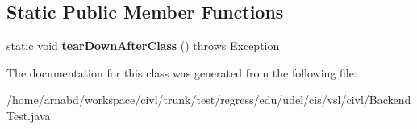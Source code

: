 \subsection*{Static Public Member Functions}
\begin{DoxyCompactItemize}
\item 
\hypertarget{classedu_1_1udel_1_1cis_1_1vsl_1_1civl_1_1BackendTest_af29d69efd634d50d443df2d17bf09dce}{}static void {\bfseries tear\+Down\+After\+Class} ()  throws Exception \label{classedu_1_1udel_1_1cis_1_1vsl_1_1civl_1_1BackendTest_af29d69efd634d50d443df2d17bf09dce}

\end{DoxyCompactItemize}


The documentation for this class was generated from the following file\+:\begin{DoxyCompactItemize}
\item 
/home/arnabd/workspace/civl/trunk/test/regress/edu/udel/cis/vsl/civl/Backend\+Test.\+java\end{DoxyCompactItemize}
